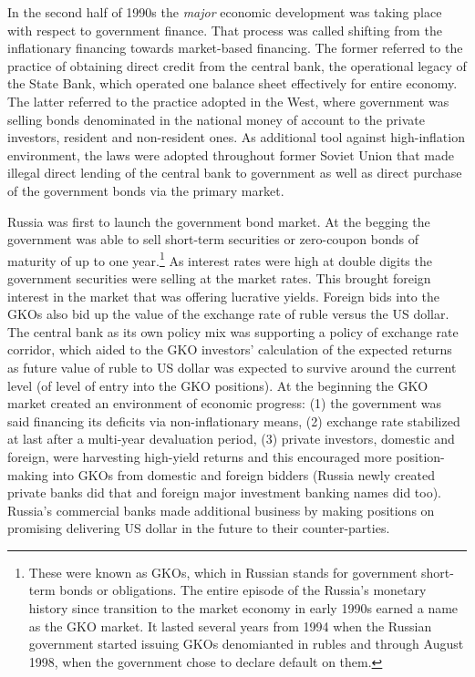 In the second half of 1990s the \textit{major} economic development was taking
place with respect to government finance. That process was called
shifting from the inflationary financing towards market-based financing.
The former referred to the practice of obtaining direct credit from the
central bank, the operational legacy of the State Bank, which operated
one balance sheet effectively for entire economy. The latter referred to
the practice adopted in the West, where government was selling bonds
denominated in the national money of account to the private
investors, resident and non-resident ones. As additional tool against
high-inflation environment, the laws were adopted throughout former
Soviet Union that made illegal direct lending of the central bank to
government as well as direct purchase of the government bonds via the
primary market.

Russia was first to launch the government bond market. At the begging
the government was able to sell short-term securities or zero-coupon
bonds of maturity of up to one year.\footnote{These were known as GKOs, which in Russian stands for government
    short-term bonds or obligations. The entire episode of the Russia's
    monetary history since transition to the market economy in early
    1990s earned a name as the GKO market. It lasted several years from
    1994 when the Russian government started issuing GKOs denomianted in
    rubles and through August 1998, when the government chose to declare
    default on them.} As interest rates were high at
double digits the government securities were selling at the market
rates. This brought foreign interest in the market that was offering
lucrative yields. Foreign bids into the GKOs also bid up the value of
the exchange rate of ruble versus the US dollar. The central bank as its
own policy mix was supporting a policy of exchange rate corridor, which
aided to the GKO investors' calculation of the expected returns as
future value of ruble to US dollar was expected to survive around the
current level (of level of entry into the GKO positions). At the
beginning the GKO market created an environment of economic progress:
(1) the government was said financing its deficits via non-inflationary
means, (2) exchange rate stabilized at last after a multi-year
devaluation period, (3) private investors, domestic and foreign, were
harvesting high-yield returns and this encouraged more position-making
into GKOs from domestic and foreign bidders (Russia newly created
private banks did that and foreign major investment banking names did
too). Russia's commercial banks made additional business by making
positions on promising delivering US dollar in the future to their
counter-parties.

